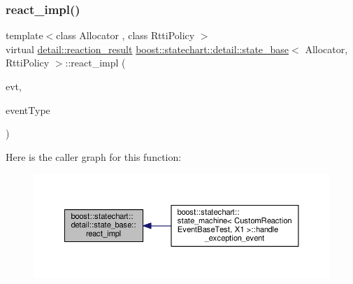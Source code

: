 \subsubsection{\texorpdfstring{react\+\_\+impl()}{react\_impl()}}
{\footnotesize\ttfamily template$<$class Allocator , class Rtti\+Policy $>$ \\
virtual \mbox{\hyperlink{namespaceboost_1_1statechart_1_1detail_ab091bbb4c29327fb46ee479ea1b7255b}{detail\+::reaction\+\_\+result}} \mbox{\hyperlink{classboost_1_1statechart_1_1detail_1_1state__base}{boost\+::statechart\+::detail\+::state\+\_\+base}}$<$ Allocator, Rtti\+Policy $>$\+::react\+\_\+impl (\begin{DoxyParamCaption}\item[{const \mbox{\hyperlink{classboost_1_1statechart_1_1event__base}{event\+\_\+base}} \&}]{evt,  }\item[{typename Rtti\+Policy\+::id\+\_\+type}]{event\+Type }\end{DoxyParamCaption})\hspace{0.3cm}{\ttfamily [pure virtual]}}

Here is the caller graph for this function\+:
\nopagebreak
\begin{figure}[H]
\begin{center}
\leavevmode
\includegraphics[width=350pt]{classboost_1_1statechart_1_1detail_1_1state__base_a2aaeac79511df5c28dc43250c83d6881_icgraph}
\end{center}
\end{figure}
\mbox{\label{classboost_1_1statechart_1_1detail_1_1state__base_a4da77bbc62b6facf16ca3abc9e0d52ce}} 

